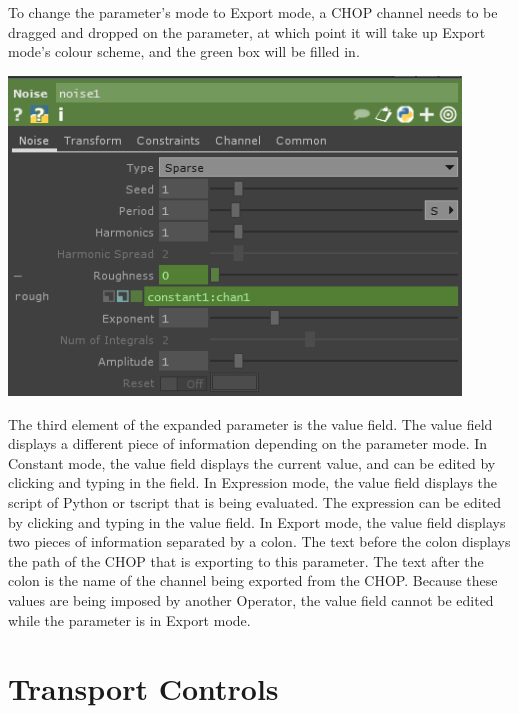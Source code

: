 \begin{fullwidth}
To change the parameter's mode to Export mode, a CHOP channel needs to be dragged and dropped on the parameter, at which point it will take up Export mode's colour scheme, and the green box will be filled in.

\begin{center}
\includegraphics[width=12cm]{./img/2.2/parameters-4.PNG}
\end{center}

The third element of the expanded parameter is the value field. The value field displays a different piece of information depending on the parameter mode. In Constant mode, the value field displays the current value, and can be edited by clicking and typing in the field. In Expression mode, the value field displays the script of Python or tscript that is being evaluated. The expression can be edited by clicking and typing in the value field. In Export mode, the value field displays two pieces of information separated by a colon. The text before the colon displays the path of the CHOP that is exporting to this parameter. The text after the colon is the name of the channel being exported from the CHOP. Because these values are being imposed by another Operator, the value field cannot be edited while the parameter is in Export mode.

\end{fullwidth}
\section{Transport Controls}

